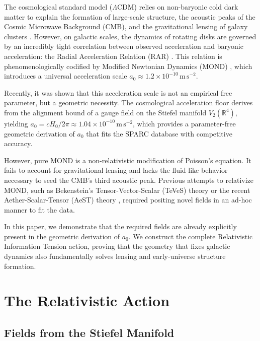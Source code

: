 \documentclass[twocolumn,amsmath,amssymb,floatfix]{article}
\newcommand{\lcdm}{\ensuremath{\Lambda}CDM}
\newcommand{\msq}{\ensuremath{\,\mathrm{m\,s^{-2}}}}
\begin{document}
The cosmological standard model (\lcdm) relies on non-baryonic cold dark matter to explain the formation of large-scale structure, the acoustic peaks of the Cosmic Microwave Background (CMB), and the gravitational lensing of galaxy clusters \citep{Planck2020, Bertone2018}. However, on galactic scales, the dynamics of rotating disks are governed by an incredibly tight correlation between observed acceleration and baryonic acceleration: the Radial Acceleration Relation (RAR) \citep{McGaugh2016}. This relation is phenomenologically codified by Modified Newtonian Dynamics (MOND) \citep{Milgrom1983, Famaey2012}, which introduces a universal acceleration scale $a_0 \approx 1.2 \times 10^{-10}\msq$.

Recently, it was shown that this acceleration scale is not an empirical free parameter, but a geometric necessity. The cosmological acceleration floor derives from the alignment bound of a gauge field on the Stiefel manifold $V_2(\mathbb{R}^4)$, yielding $a_0 = c H_0 / 2\pi \approx 1.04 \times 10^{-10}\msq$, which provides a parameter-free geometric derivation of $a_0$ that fits the SPARC database with competitive accuracy.

However, pure MOND is a non-relativistic modification of Poisson's equation. It fails to account for gravitational lensing \citep{Clowe2006} and lacks the fluid-like behavior necessary to seed the CMB's third acoustic peak. Previous attempts to relativize MOND, such as Bekenstein's Tensor-Vector-Scalar (TeVeS) theory \citep{Bekenstein2004} or the recent Aether-Scalar-Tensor (AeST) theory \citep{Skordis2021}, required positing novel fields in an ad-hoc manner to fit the data.

In this paper, we demonstrate that the required fields are already explicitly present in the geometric derivation of $a_0$. We construct the complete Relativistic Information Tension action, proving that the geometry that fixes galactic dynamics also fundamentally solves lensing and early-universe structure formation.

\section{The Relativistic Action}

\subsection{Fields from the Stiefel Manifold}
\end{document}

